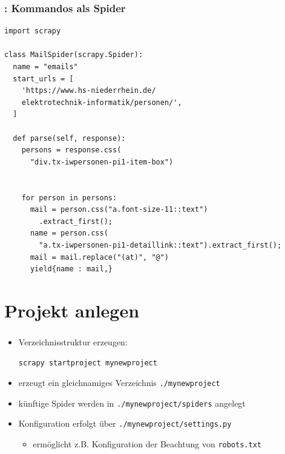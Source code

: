 \documentclass{beamer}
\begin{document}
\begin{frame}
	\frametitle{\insertsection{}: \insertsubsection{} Kommandos als Spider}

\begin{lstlisting}  
import scrapy

class MailSpider(scrapy.Spider):
  name = "emails"
  start_urls = [
    'https://www.hs-niederrhein.de/
    elektrotechnik-informatik/personen/',
  ]

  def parse(self, response):
    persons = response.css(
      "div.tx-iwpersonen-pi1-item-box")


    for person in persons:
      mail = person.css("a.font-size-11::text")
        .extract_first();
      name = person.css(
        "a.tx-iwpersonen-pi1-detaillink::text").extract_first();
      mail = mail.replace("(at)", "@")
      yield{name : mail,}
      \end{lstlisting}
\end{frame}

\section{Projekt anlegen}
\begin{frame}[fragile]
	\frametitle{\insertsection}
	\begin{itemize}
		\item Verzeichnisstruktur erzeugen:
			\begin{lstlisting}
scrapy startproject mynewproject
			\end{lstlisting}
		\item erzeugt ein gleichnamiges Verzeichnis \verb|./mynewproject| 
		\item künftige Spider werden in \verb|./mynewproject/spiders| angelegt
		\item Konfiguration erfolgt über \verb|./mynewproject/settings.py|
		\begin{itemize}
		  \item ermöglicht z.B. Konfiguration der Beachtung von \lstinline|robots.txt|
  		\end{itemize}
	\end{itemize}
\end{frame}
\end{document}

